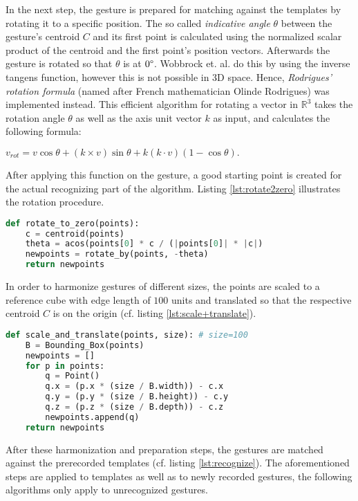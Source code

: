 In the next step, the gesture is prepared for matching against the templates by rotating it to a specific position. The so called \textit{indicative angle} $\theta$ between the gesture's centroid $C$ and its first point is calculated using the normalized scalar product of the centroid and the first point's position vectors. Afterwards the gesture is rotated so that $\theta$ is at $0\degree$. Wobbrock et. al. do this by using the inverse tangens function, however this is not possible in 3D space. Hence, \textit{Rodrigues' rotation formula} (named after French mathematician Olinde Rodrigues) was implemented instead. This efficient algorithm for rotating a vector in $\mathbb{R}^3$ takes the rotation angle $\theta$ as well as the axis unit vector $k$ as input, and calculates the following formula:

\begin{center}
\(
v_{rot} = v \cos\theta + (k \times v)\sin\theta + k (k \cdot v) (1 - \cos\theta).
\) \cite{koks2006}
\end{center}

After applying this function on the gesture, a good starting point is created for the actual recognizing part of the algorithm. Listing \ref{lst:rotate2zero} illustrates the rotation procedure.

\begin{lstlisting}[label=lst:rotate2zero,language=python,frame=lt,caption=Rotation of points so that their indicative angle is at $0 \degree$]
def rotate_to_zero(points):
	c = centroid(points)
	theta = acos(points[0] * c / (|points[0]| * |c|)
	newpoints = rotate_by(points, -theta)
	return newpoints
\end{lstlisting}

In order to harmonize gestures of different sizes, the points are scaled to a reference cube with edge length of $100$ units and translated so that the respective centroid $C$ is on the origin (cf. listing \ref{lst:scale+translate}).

\begin{lstlisting}[label=lst:scale+translate,language=python,frame=lt,caption=Scaling to reference cube and translation to origin]
def scale_and_translate(points, size): # size=100
	B = Bounding_Box(points)
	newpoints = []
	for p in points:
		q = Point()
		q.x = (p.x * (size / B.width)) - c.x
		q.y = (p.y * (size / B.height)) - c.y
		q.z = (p.z * (size / B.depth)) - c.z
		newpoints.append(q)
	return newpoints
\end{lstlisting}

After these harmonization and preparation steps, the gestures are matched against the prerecorded templates (cf. listing \ref{lst:recognize}). The aforementioned steps are applied to templates as well as to newly recorded gestures, the following algorithms only apply to unrecognized gestures.

